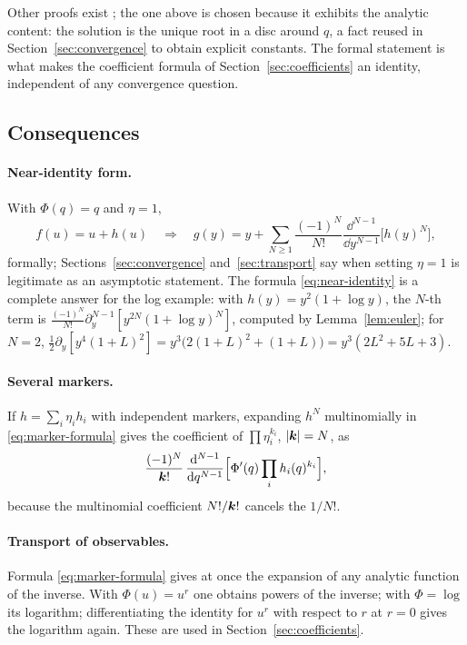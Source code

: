 \begin{remark}
Other proofs exist \cite{gessel,surya,dlmf}; the one above is chosen because it exhibits the analytic content: the solution is the unique root in a disc around $q$, a fact reused in Section~\ref{sec:convergence} to obtain explicit constants. The formal statement is what makes the coefficient formula of Section~\ref{sec:coefficients} an identity, independent of any convergence question.
\end{remark}

\subsection{Consequences}

\paragraph{Near-identity form.} With $\Phi(q)=q$ and $\eta=1$,
\begin{equation}
 f(u)=u+h(u)\quad\Longrightarrow\quad g(y)=y+\sum_{N\ge1}\frac{(-1)^N}{N!}\frac{\dd^{N-1}}{\dd y^{N-1}}\bigl[h(y)^N\bigr],
 \label{eq:near-identity}
\end{equation}
formally; Sections~\ref{sec:convergence} and~\ref{sec:transport} say when setting $\eta=1$ is legitimate as an asymptotic statement. The formula \eqref{eq:near-identity} is a complete answer for the log example: with $h(y)=y^2(1+\log y)$, the $N$-th term is $\frac{(-1)^N}{N!}\partial_y^{N-1}[y^{2N}(1+\log y)^N]$, computed by Lemma~\ref{lem:euler}; for $N=2$, $\frac12\partial_y[y^4(1+L)^2]=y^3\bigl(2(1+L)^2+(1+L)\bigr)=y^3(2L^2+5L+3)$.

\paragraph{Several markers.} If $h=\sum_i\eta_ih_i$ with independent markers, expanding $h^N$ multinomially in \eqref{eq:marker-formula} gives the coefficient of $\prod\eta_i^{k_i}$, $|\boldsymbol k|=N$, as
\begin{equation}
 \frac{(-1)^N}{\boldsymbol k!}\,\frac{\mathrm d^{N-1}}{\mathrm d q^{N-1}}\Bigl[\Phi'(q)\prod_ih_i(q)^{k_i}\Bigr],
 \label{eq:multi-marker}
\end{equation}
because the multinomial coefficient $N!/\boldsymbol k!$ cancels the $1/N!$.

\paragraph{Transport of observables.} Formula \eqref{eq:marker-formula} gives at once the expansion of any analytic function of the inverse. With $\Phi(u)=u^r$ one obtains powers of the inverse; with $\Phi=\log$ its logarithm; differentiating the identity for $u^r$ with respect to $r$ at $r=0$ gives the logarithm again. These are used in Section~\ref{sec:coefficients}.

